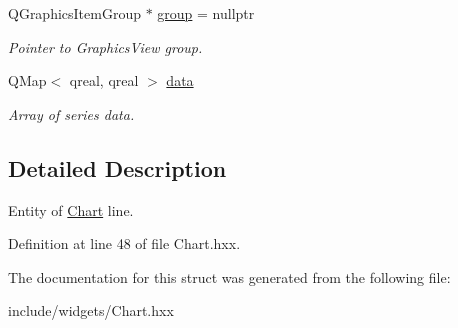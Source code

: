 \begin{DoxyCompactItemize}
Q\+Graphics\+Item\+Group $\ast$ \mbox{\hyperlink{structeven_1_1_chart_1_1_series_a6fd1c5b7e9eb3dc6a208da843027ec62}{group}} = nullptr
\begin{DoxyCompactList}\small\item\em Pointer to Graphics\+View group. \end{DoxyCompactList}\item 
\mbox{\label{structeven_1_1_chart_1_1_series_a4cf7a338e6350abc43a25494bbcf6e38}} 
Q\+Map$<$ qreal, qreal $>$ \mbox{\hyperlink{structeven_1_1_chart_1_1_series_a4cf7a338e6350abc43a25494bbcf6e38}{data}}
\begin{DoxyCompactList}\small\item\em Array of series data. \end{DoxyCompactList}\end{DoxyCompactItemize}


\subsection{Detailed Description}
Entity of \mbox{\hyperlink{classeven_1_1_chart}{Chart}} line. 

Definition at line 48 of file Chart.\+hxx.



The documentation for this struct was generated from the following file\+:\begin{DoxyCompactItemize}
\item 
include/widgets/Chart.\+hxx\end{DoxyCompactItemize}
